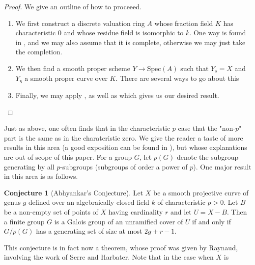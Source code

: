 \documentclass{article}
\theoremstyle{definition}
\newtheorem{conjecture}[theorem]{Conjecture}
\theoremstyle{remark}
\begin{document}
\begin{proof} We give an outline of how to proceeed.
	\begin{enumerate}
		\item We first construct a discrete valuation ring $A$ whose fraction field $K$ has characteristic 0 and whose residue field is isomorphic to $k$.
	One way is found in , and we may also assume that it is complete, otherwise we may just take the completion. 
\item We then find a smooth proper scheme $Y \to \text{Spec}(A)$ such that $Y_{s} = X$ and $Y_{\eta}$ a smooth proper curve over $K$.
	There are several ways to go about this 
\item Finally, we may apply , as well as  which gives us our desired result. 
	\end{enumerate}
	
\end{proof}

Just as above, one often finds that in the characteristic $p$ case that the "non-$p$" part is the same as in the charateristic zero.
We give the reader a taste of more results in this area (a good exposition can be found in  \cite{abhyankar}), but whose explanations are out of scope of this paper.
For a group $G$, let $p(G)$ denote the subgroup generating by all $p$-subgroups (subgroups of order a power of $p$).
One major result in this area is as follows.

\begin{conjecture}[Abhyankar's Conjecture]
	Let $X$ be a smooth projective curve of genus $g$ defined over an algebraically closed field $k$ of characteristic $p > 0$.
	Let $B$ be a non-empty set of points of $X$ having cardinality $r$ and let $U = X - B$.
	Then a finite group $G$ is a Galois group of an unramified cover of $U$ if and only if $G/p(G)$ has a generating set of size at most $2g + r -1$.
\end{conjecture}

This conjecture is in fact now a theorem, whose proof was given by Raynaud, involving the work of Serre and Harbater.
Note that in the case when $X$ is  




\newpage


\end{document}
